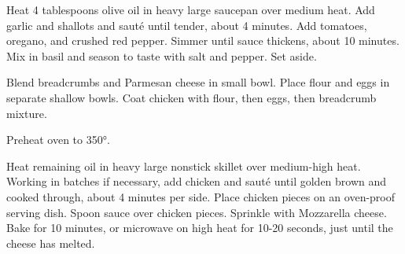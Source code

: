 Heat 4 tablespoons olive oil in heavy large saucepan over medium heat. 
Add garlic and shallots and sauté until tender, about 4 minutes. 
Add tomatoes, oregano, and crushed red pepper. 
Simmer until sauce thickens, about 10 minutes. 
Mix in basil and season to taste with salt and pepper. 
Set aside.

Blend breadcrumbs and Parmesan cheese in small bowl. 
Place flour and eggs in separate shallow bowls. 
Coat chicken with flour, then eggs, then breadcrumb mixture.

Preheat oven to 350°. 

Heat remaining oil in heavy large nonstick skillet over medium-high heat.
Working in batches if necessary, add chicken and sauté until golden brown and cooked through, about 4 minutes per side.
Place chicken pieces on an oven-proof serving dish. 
Spoon sauce over chicken pieces. Sprinkle with Mozzarella cheese. 
Bake for 10 minutes, or microwave on high heat for 10-20 seconds, just until the cheese has melted.

